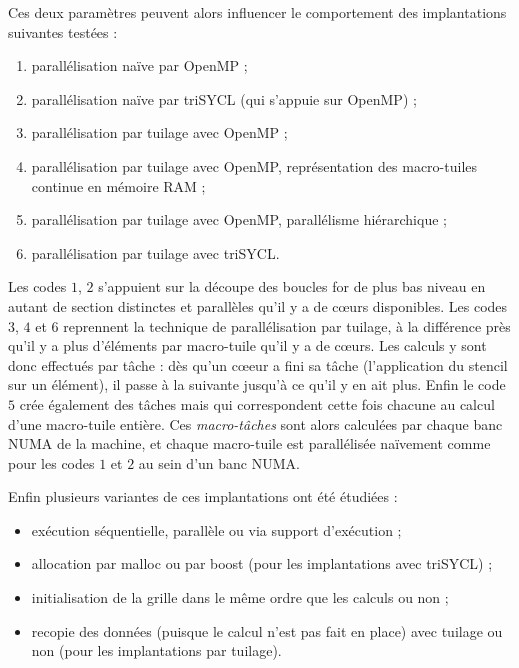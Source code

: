 Ces deux paramètres peuvent alors influencer le comportement des implantations suivantes testées :
\begin{enumerate}
\item parallélisation naïve par \textsf{OpenMP} ;
\item parallélisation naïve par \textsf{triSYCL} (qui s'appuie sur \textsf{OpenMP}) ;
\item parallélisation par tuilage avec \textsf{OpenMP} ;
\item parallélisation par tuilage avec \textsf{OpenMP}, représentation des macro-tuiles continue en mémoire RAM ;
\item parallélisation par tuilage avec \textsf{OpenMP}, parallélisme hiérarchique ;
\item parallélisation par tuilage avec \textsf{triSYCL}.
\end{enumerate}
Les codes $1$, $2$ s'appuient sur la découpe des boucles \textsf{for} de plus bas niveau en autant de section distinctes et parallèles qu'il y a de cœurs disponibles. Les codes $3$, $4$ et $6$ reprennent la technique de parallélisation par tuilage, à la différence près qu'il y a plus d'éléments par macro-tuile qu'il y a de cœurs. Les calculs y sont donc effectués par tâche : dès qu'un cœeur a fini sa tâche (l'application du stencil sur un élément), il passe à la suivante jusqu'à ce qu'il y en ait plus. Enfin le code $5$ crée également des tâches mais qui correspondent cette fois chacune au calcul d'une macro-tuile entière. Ces \emph{macro-tâches} sont alors calculées par chaque banc NUMA de la machine, et chaque macro-tuile est parallélisée naïvement comme pour les codes $1$ et $2$ au sein d'un banc NUMA.

Enfin plusieurs variantes de ces implantations ont été étudiées :
\begin{itemize}
\item exécution séquentielle, parallèle ou via support d'exécution ;
\item allocation par \textsf{malloc} ou par \textsf{boost} (pour les implantations avec \textsf{triSYCL}) ;
\item initialisation de la grille dans le même ordre que les calculs ou non ;
\item recopie des données (puisque le calcul n'est pas fait en place) avec tuilage ou non (pour les implantations par tuilage).
\end{itemize}

